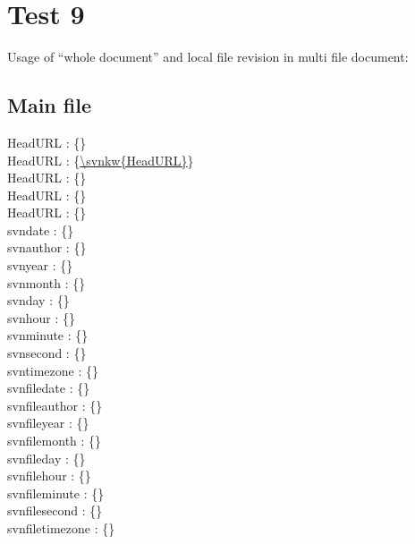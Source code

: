 \documentclass[12pt]{report}
\begin{document}
\chapter{Test 9}
Usage of ``whole document'' and local file revision in multi file document:\\

\section{Main file}
\noindent
HeadURL : \{\texttt{}\} \\
HeadURL : \{\url{\svnkw{HeadURL}}\} \\
HeadURL : \{\href{\svnkw{HeadURL}}{}\} \\
HeadURL : \{\} \\
HeadURL : \{\} \\
 svndate : \{\svndate\} \\
 svnauthor : \{\svnauthor\} \\
 svnyear : \{\svnyear\} \\
 svnmonth : \{\svnmonth\} \\
 svnday : \{\svnday\} \\
 svnhour : \{\svnhour\} \\
 svnminute : \{\svnminute\} \\
 svnsecond : \{\svnsecond\} \\
 svntimezone : \{\svntimezone\} \\

\noindent
 svnfiledate : \{\svnfiledate\} \\
 svnfileauthor : \{\svnfileauthor\} \\
 svnfileyear : \{\svnfileyear\} \\
 svnfilemonth : \{\svnfilemonth\} \\
 svnfileday : \{\svnfileday\} \\
 svnfilehour : \{\svnfilehour\} \\
 svnfileminute : \{\svnfileminute\} \\
 svnfilesecond : \{\svnfilesecond\} \\
 svnfiletimezone : \{\svnfiletimezone\} \\


\end{document}
